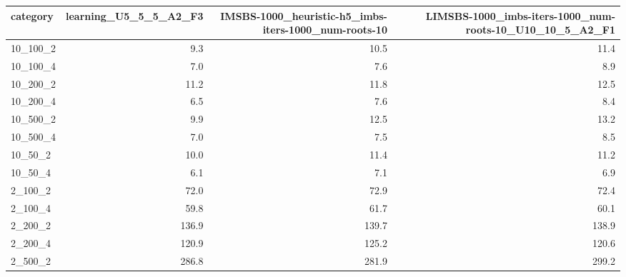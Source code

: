 \begin{tabular}{lrrr}
\toprule
category &  learning\_U5\_5\_5\_A2\_F3 &  IMSBS-1000\_heuristic-h5\_imbs-iters-1000\_num-roots-10 &  LIMSBS-1000\_imbs-iters-1000\_num-roots-10\_U10\_10\_5\_A2\_F1 \\
\midrule
10\_100\_2 &                    9.3 &                                               10.5 &                                               11.4 \\
10\_100\_4 &                    7.0 &                                                7.6 &                                                8.9 \\
10\_200\_2 &                   11.2 &                                               11.8 &                                               12.5 \\
10\_200\_4 &                    6.5 &                                                7.6 &                                                8.4 \\
10\_500\_2 &                    9.9 &                                               12.5 &                                               13.2 \\
10\_500\_4 &                    7.0 &                                                7.5 &                                                8.5 \\
 10\_50\_2 &                   10.0 &                                               11.4 &                                               11.2 \\
 10\_50\_4 &                    6.1 &                                                7.1 &                                                6.9 \\
 2\_100\_2 &                   72.0 &                                               72.9 &                                               72.4 \\
 2\_100\_4 &                   59.8 &                                               61.7 &                                               60.1 \\
 2\_200\_2 &                  136.9 &                                              139.7 &                                              138.9 \\
 2\_200\_4 &                  120.9 &                                              125.2 &                                              120.6 \\
 2\_500\_2 &                  286.8 &                                              281.9 &                                              299.2 \\

\end{tabular}
